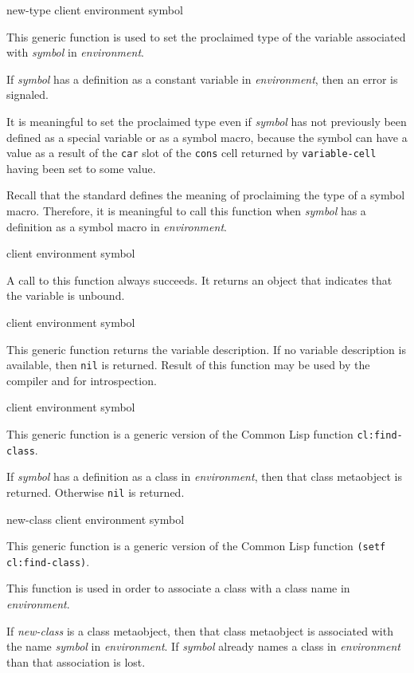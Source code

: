  {new-type client environment symbol}

This generic function is used to set the proclaimed type of the
variable associated with \textit{symbol} in \textit{environment}.

If \textit{symbol} has a definition as a constant variable in
\textit{environment}, then an error is signaled.

It is meaningful to set the proclaimed type even if \textit{symbol}
has not previously been defined as a special variable or as a symbol
macro, because the symbol can have a value as a result of the
\texttt{car} slot of the \texttt{cons} cell returned by
\texttt{variable-cell} having been set to some value.

Recall that the \commonlisp{} standard defines the meaning of
proclaiming the type of a symbol macro.  Therefore, it is meaningful
to call this function when \textit{symbol} has a definition as a
symbol macro in \textit{environment}.

 {client environment symbol}

A call to this function always succeeds.  It returns an object that indicates
that the variable is unbound.

 {client environment symbol}

This generic function returns the variable description. If no variable
description is available, then \texttt{nil} is returned. Result of this
function may be used by the compiler and for introspection.

 {client environment symbol}

This generic function is a generic version of the Common Lisp function
\texttt{cl:find-class}.

If \textit{symbol} has a definition as a class in
\textit{environment}, then that class metaobject is returned.
Otherwise \texttt{nil} is returned.

 {new-class client environment symbol}

This generic function is a generic version of the Common Lisp function
\texttt{(setf cl:find-class)}.

This function is used in order to associate a class with a class name
in \textit{environment}.

If \textit{new-class} is a class metaobject, then that class
metaobject is associated with the name \textit{symbol} in
\textit{environment}.  If \textit{symbol} already names a class in
\textit{environment} than that association is lost.


